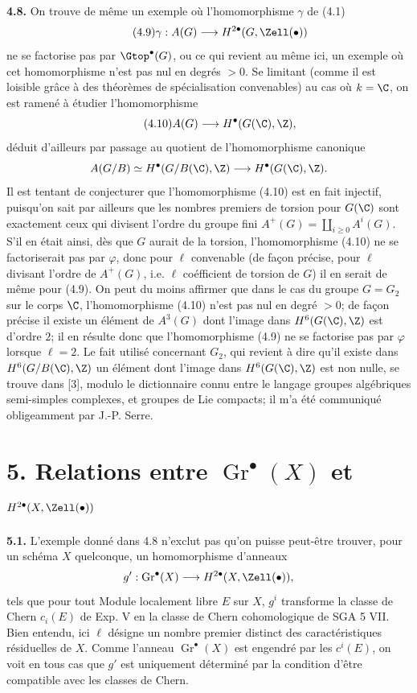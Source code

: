 \textbf{4.8.} On trouve de même un exemple où l'homomorphisme $\gamma$ de (4.1)
\begin{equation}\tag{4.9}
 \gamma:A(G)\longrightarrow H^{2\bullet}(G,\Zell(\bullet))
\end{equation}
ne se factorise pas par $\Gtop^\bullet(G)$, ou ce qui revient au même ici, un exemple où cet homomorphisme n'est pas nul en degrés $>0$. Se limitant (comme il est loisible grâce à des théorèmes de spécialisation convenables) au cas où $k=\C$, on est ramené à étudier l'homomorphisme
\begin{equation}\tag{4.10}
 A(G)\longrightarrow H^\bullet(G(\C),\Z),
\end{equation}
déduit d'ailleurs par passage au quotient de l'homomorphisme canonique
\[
 A(G/B)\simeq H^\bullet(G/B(\C),\Z)\longrightarrow H^\bullet(G(\C),\Z).
\]
Il est tentant de conjecturer que l'homomorphisme (4.10) est en fait injectif, puisqu'on sait par ailleurs que les nombres premiers de torsion pour $G(\C)$ sont exactement ceux qui divisent l'ordre du groupe fini $A^+(G)=\coprod_{i\geq0}A^i(G)$. S'il en était ainsi, dès que $G$ aurait de la torsion, l'homomorphisme (4.10) ne se factoriserait pas par $\varphi$, donc pour $\ell$ convenable (de façon précise, pour $\ell$ divisant l'ordre de $A^+(G)$, i.e. $\ell$ coéfficient de torsion de $G$) il en serait de même pour (4.9). On peut du moins affirmer que dans le cas du groupe $G=G_2$ sur le corps $\C$, l'homomorphisme (4.10) n'est pas nul en degré $>0$; de façon précise il existe un élément de $A^3(G)$ dont l'image dans $H^6(G(\C),\Z)$ est d'ordre $2$; il en résulte donc que l'homomorphisme (4.9) ne se factorise pas par $\varphi$ lorsque $\ell=2$. Le fait utilisé concernant $G_2$, qui revient à dire qu'il existe dans $H^6(G/B(\C),\Z)$ un élément dont l'image dans $H^6(G(\C),\Z)$ est non nulle, se trouve dans [3], modulo le dictionnaire connu entre le langage groupes algébriques semi-simples complexes, et groupes de Lie compacts; il m'a été communiqué obligeamment par J.-P. Serre.

\section*{5. Relations entre \(\operatorname{Gr}^\bullet(X)\) et \(H^{2\bullet}(X,\Zell(\bullet))\)}

\textbf{5.1.} L'exemple donné dans 4.8 n'exclut pas qu'on puisse peut-être trouver, pour un schéma $X$ quelconque, un homomorphisme d'anneaux
\[
 g':\operatorname{Gr}^\bullet(X)\longrightarrow H^{2\bullet}(X,\Zell(\bullet)),
\]
tels que pour tout Module localement libre $E$ sur $X$, $g^i$ transforme la classe de Chern $c_i(E)$ de Exp. V en la classe de Chern cohomologique de SGA 5 VII. Bien entendu, ici $\ell$ désigne un nombre premier distinct des caractéristiques résiduelles de $X$. Comme l'anneau $\operatorname{Gr}^\bullet(X)$ est engendré par les $c^i(E)$, on voit en tous cas que $g'$ est uniquement déterminé par la condition d'être compatible avec les classes de Chern.

